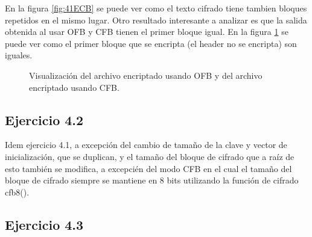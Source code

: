 \documentclass[a4paper,10pt]{article}
\begin{document}
En la figura \ref{fig:41ECB} se puede ver como el texto cifrado tiene tambien bloques
repetidos en el mismo lugar. Otro resultado interesante a analizar es que la salida obtenida al usar
OFB y CFB tienen el primer bloque igual. En la figura \ref{fig:41OFBCFB} se puede ver
como el primer bloque que se encripta (el header no se encripta) son iguales.
\begin{figure}
	\begin{center}
	\end{center}
	\caption{Visualización del archivo encriptado usando OFB y del archivo encriptado usando CFB.}
	\label{fig:41OFBCFB}
\end{figure}

\subsection{Ejercicio 4.2}
Idem ejercicio 4.1, a excepci\'on del cambio de tama\~no de la clave y vector de inicializaci\'on, que se duplican, y el tama\~no del bloque de cifrado que a ra\'iz de esto tambi\'en se modifica, a excepci\'en del modo CFB en el cual el tama\~no del bloque de cifrado siempre se mantiene en 8 bits utilizando la funci\'on de cifrado cfb8().
\subsection{Ejercicio 4.3}
\end{document}
